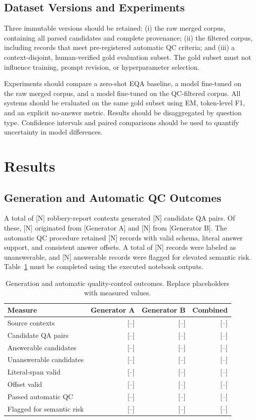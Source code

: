 \documentclass[graybox]{SNmult}
\begin{document}
\subsection{Dataset Versions and Experiments}

Three immutable versions should be retained: (i) the raw merged corpus, containing all parsed candidates and complete provenance; (ii) the filtered corpus, including records that meet pre-registered automatic QC criteria; and (iii) a context-disjoint, human-verified gold evaluation subset. The gold subset must not influence training, prompt revision, or hyperparameter selection.

Experiments should compare a zero-shot EQA baseline, a model fine-tuned on the raw merged corpus, and a model fine-tuned on the QC-filtered corpus. All systems should be evaluated on the same gold subset using EM, token-level F1, and an explicit no-answer metric. Results should be disaggregated by question type. Confidence intervals and paired comparisons should be used to quantify uncertainty in model differences.

\section{Results}
\label{sec:results}

\subsection{Generation and Automatic QC Outcomes}

A total of [N] robbery-report contexts generated [N] candidate QA pairs. Of these, [N] originated from [Generator A] and [N] from [Generator B]. The automatic QC procedure retained [N] records with valid schema, literal answer support, and consistent answer offsets. A total of [N] records were labeled as unanswerable, and [N] answerable records were flagged for elevated semantic risk. Table~\ref{tab:qc-results} must be completed using the executed notebook outputs.

\begin{table}[!t]
\caption{Generation and automatic quality-control outcomes. Replace placeholders with measured values.}
\label{tab:qc-results}
\centering
\small
\begin{tabular}{lrrr}
\toprule
Measure & Generator A & Generator B & Combined \\
\midrule
Source contexts & [--] & [--] & [--] \\
Candidate QA pairs & [--] & [--] & [--] \\
Answerable candidates & [--] & [--] & [--] \\
Unanswerable candidates & [--] & [--] & [--] \\
Literal-span valid & [--] & [--] & [--] \\
Offset valid & [--] & [--] & [--] \\
Passed automatic QC & [--] & [--] & [--] \\
Flagged for semantic risk & [--] & [--] & [--] \\
\bottomrule
\end{tabular}
\end{table}
\end{document}
